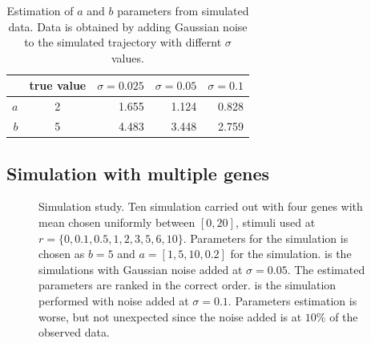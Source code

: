 \begin{table}[!t]
    \centering
\begin{tabular}{r||c|rrr}
  \hline \hline
   & true value & $\sigma = 0.025$ & $\sigma = 0.05$ & $\sigma = 0.1$ \\ 
  \hline
  $a$ & 2 & 1.655 & 1.124 & 0.828 \\ 
  $b$ & 5 & 4.483 & 3.448 & 2.759 \\ 
   \hline
 \end{tabular}
 \caption{Estimation of $a$ and $b$ parameters from simulated data. Data is obtained by adding Gaussian noise to the simulated trajectory with differnt $\sigma$ values. }
 \label{tab:fit-cc-single}
\end{table}

\subsection{Simulation with multiple genes}
\label{sec:simul-with-mult}
\begin{figure}
  \centering
  \caption{Simulation study. Ten simulation carried out with four genes with mean chosen uniformly between $[0, 20]$, stimuli used at $r =\lbrace 0, 0.1, 0.5, 1, 2, 3, 5, 6, 10 \rbrace$. Parameters for the simulation is chosen as $b=5$ and $a=[1, 5, 10, 0.2]$ for the simulation.  is the simulations with Gaussian noise added at $\sigma = 0.05$. The estimated parameters are ranked in the correct order.  is the simulation performed with noise added at $\sigma = 0.1$. Parameters estimation is worse, but not unexpected since the noise added is at $10\%$ of the observed data.}
  \label{fig:cc-4gn}
\end{figure}

